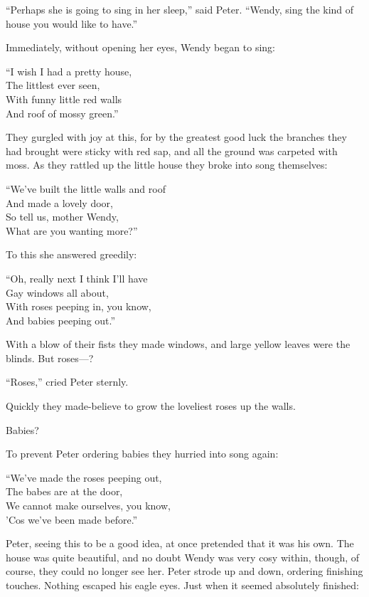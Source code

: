 ``Perhaps she is going to sing in her sleep,'' said Peter.
``Wendy, sing the kind of house you would like to have.''

Immediately, without opening her eyes, Wendy began to sing:

``I wish I had a pretty house,\\
    The littlest ever seen,\\
With funny little red walls\\
    And roof of mossy green.''

They gurgled with joy at this, for by the greatest good luck the branches they
had brought were sticky with red sap, and all the ground was carpeted with moss.
As they rattled up the little house they broke into song themselves:

``We've built the little walls and roof\\
    And made a lovely door,\\
So tell us, mother Wendy,\\
    What are you wanting more?''

To this she answered greedily:

``Oh, really next I think I'll have\\
    Gay windows all about,\\
With roses peeping in, you know,\\
    And babies peeping out.''

With a blow of their fists they made windows, and large yellow leaves were the
blinds. But roses---?

``Roses,'' cried Peter sternly.

Quickly they made-believe to grow the loveliest roses up the walls.

Babies?

To prevent Peter ordering babies they hurried into song again:

``We've made the roses peeping out,\\
    The babes are at the door,\\
We cannot make ourselves, you know,\\
    'Cos we've been made before.''

Peter, seeing this to be a good idea, at once pretended that it was his own.
The house was quite beautiful, and no doubt Wendy was very cosy within, though,
of course, they could no longer see her.
Peter strode up and down, ordering finishing touches. Nothing escaped his eagle
eyes.
Just when it seemed absolutely finished:

